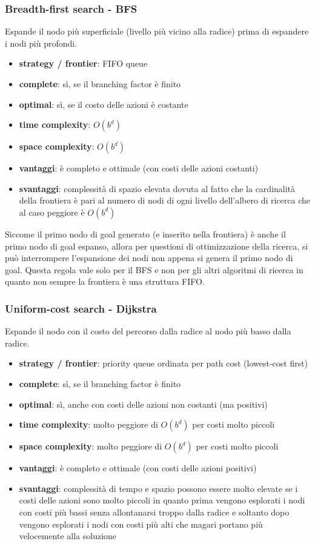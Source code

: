 \subsubsection*{Breadth-first search - BFS}
Espande il nodo più superficiale (livello più vicino alla radice) prima di espandere i nodi più profondi.
\begin{itemize}
	\item \textbf{strategy / frontier}: FIFO queue
	\item \textbf{complete}: sì, se il branching factor è finito
	\item \textbf{optimal}: sì, se il costo delle azioni è costante
	\item \textbf{time complexity}: \(O(b^{d})\) 
	\item \textbf{space complexity}: \(O(b^{d})\)
	\item \textbf{vantaggi}: è completo e ottimale (con costi delle azioni costanti)
	\item \textbf{svantaggi}: complessità di spazio elevata dovuta al fatto che la cardinalità della frontiera è pari al numero
	di nodi di ogni livello dell'albero di ricerca che al caso peggiore è \(O(b^{d})\)
\end{itemize}
Siccome il primo nodo di goal generato (e inserito nella frontiera) è anche il primo nodo di goal espanso, allora per questioni
di ottimizzazione della ricerca, si può interrompere l'espansione dei nodi non appena si genera il primo nodo di goal. Questa
regola vale solo per il BFS e non per gli altri algoritmi di ricerca in quanto non sempre la frontiera è una struttura FIFO.

\subsubsection*{Uniform-cost search - Dijkstra}
Espande il nodo con il costo del percorso dalla radice al nodo più basso dalla radice.
\begin{itemize}
	\item \textbf{strategy / frontier}: priority queue ordinata per path cost (lowest-cost first)
	\item \textbf{complete}: sì, se il branching factor è finito
	\item \textbf{optimal}: sì, anche con costi delle azioni non costanti (ma positivi)
	\item \textbf{time complexity}: molto peggiore di \(O(b^{d})\) per costi molto piccoli
	\item \textbf{space complexity}: molto peggiore di \(O(b^{d})\) per costi molto piccoli
	\item \textbf{vantaggi}: è completo e ottimale (con costi delle azioni positivi)
	\item \textbf{svantaggi}: complessità di tempo e spazio possono essere molto elevate se i costi delle azioni sono molto
	piccoli in quanto prima vengono esplorati i nodi con costi più bassi senza allontanarsi troppo dalla radice e soltanto
	dopo vengono esplorati i nodi con costi più alti che magari portano più velocemente alla soluzione
\end{itemize}

